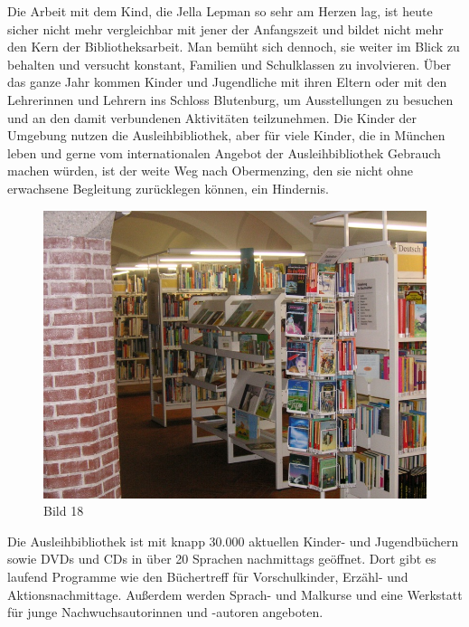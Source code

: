 \documentclass[a4paper,
fontsize=11pt,
oneside,
numbers=noperiodatend,
parskip=half-,
bibliography=totoc,
final
]{scrartcl}
\begin{document}
Die Arbeit mit dem Kind, die Jella Lepman so sehr am Herzen lag, ist
heute sicher nicht mehr vergleichbar mit jener der Anfangszeit und
bildet nicht mehr den Kern der Bibliotheksarbeit. Man bemüht sich
dennoch, sie weiter im Blick zu behalten und versucht konstant, Familien
und Schulklassen zu involvieren. Über das ganze Jahr kommen Kinder und
Jugendliche mit ihren Eltern oder mit den Lehrerinnen und Lehrern ins
Schloss Blutenburg, um Ausstellungen zu besuchen und an den damit
verbundenen Aktivitäten teilzunehmen. Die Kinder der Umgebung nutzen die
Ausleihbibliothek, aber für viele Kinder, die in München leben und gerne
vom internationalen Angebot der Ausleihbibliothek Gebrauch machen
würden, ist der weite Weg nach Obermenzing, den sie nicht ohne
erwachsene Begleitung zurücklegen können, ein Hindernis.~

\begin{figure}[htbp]
\centering
\includegraphics{img/Bild18.jpg}
\caption{Bild 18}
\end{figure}

Die Ausleihbibliothek ist mit knapp 30.000 aktuellen Kinder- und
Jugendbüchern sowie DVDs und CDs in über 20 Sprachen nachmittags
geöffnet. Dort gibt es laufend Programme wie den Büchertreff für
Vorschulkinder, Erzähl- und Aktionsnachmittage. Außerdem werden Sprach-
und Malkurse und eine Werkstatt für junge Nachwuchsautorinnen und
-autoren angeboten.
\end{document}
